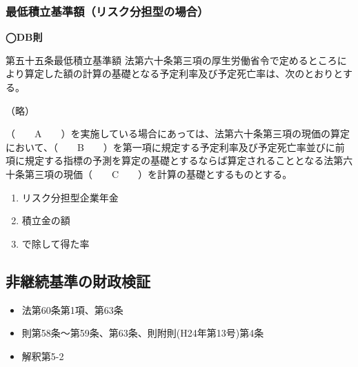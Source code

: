 \newpage

\subsubsection{最低積立基準額（リスク分担型の場合）}


\begin{fillblank}
  \noindent \textbf{◯DB則}
  \begin{lawstructure}
    \begin{lawarticle}{第五十五条}{最低積立基準額}
      法第六十条第三項の厚生労働省令で定めるところにより算定した額の計算の基礎となる予定利率及び予定死亡率は、次のとおりとする。

      （略）

      （　　A　　）を実施している場合にあっては、法第六十条第三項の現価の算定において、（　　B　　）を第一項に規定する予定利率及び予定死亡率並びに前項に規定する指標の予測を算定の基礎とするならば算定されることとなる法第六十条第三項の現価（　　C　　）を計算の基礎とするものとする。
    \end{lawarticle}
  \end{lawstructure}
\end{fillblank}

\begin{answerbox}
  \begin{enumerate}[A: ]
    \item リスク分担型企業年金
    \item 積立金の額
    \item で除して得た率
  \end{enumerate}
\end{answerbox}

\newpage

\subsection{非継続基準の財政検証}


\begin{InyouJobunbox}
  \begin{itemize}
    \item 法第60条第1項、第63条
    \item 則第58条〜第59条、第63条、則附則(H24年第13号)第4条
    \item 解釈第5-2
  \end{itemize}
\end{InyouJobunbox}

